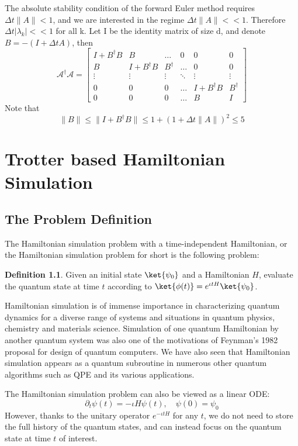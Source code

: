 \documentclass[12pt, oneside]{book}
\theoremstyle{definition}
\newtheorem{definition}{Definition}[section]
\theoremstyle{definition}
\theoremstyle{remark}
\begin{document}
The absolute stability condition of the forward Euler method requires $\Delta t\|A\|<1$, and we are interested in the regime $\Delta t\|A\|<<1$. Therefore $\Delta t|\lambda_k|<<1$ for all k. Let I be the identity matrix of size d, and denote $B=-(I+\Delta tA)$, then
\[
\mathcal{A}^{\dagger}\mathcal{A}=\begin{bmatrix} I + B^{\dagger}B & B & \ldots & 0 & 0 & 0 \\ B & I + B^{\dagger}B & B^{\dagger} & \ldots & 0 & 0 \\
\vdots & \vdots & \vdots & \ddots &\vdots & \vdots  \\
0 & 0 & 0 & \ldots & I+B^{\dagger}B & B^{\dagger} \\
0 & 0 & 0 & \ldots & B & I \end{bmatrix}
\]
Note that
\[
\|B\|\leq \|I+B^{\dagger}B\|\leq 1+(1+\Delta t\|A\|)^2\leq 5
\]
\chapter{Trotter based Hamiltonian Simulation}
\section{The Problem Definition}
The Hamiltonian simulation problem with a time-independent Hamiltonian, or the Hamiltonian simulation problem for short is the following problem: 
\begin{definition}Given an initial state $\ket{\psi_0}$ and a Hamiltonian $H$, evaluate the quantum state at time $t$ according to $\ket{\phi(t)}=e^{\iota t H}\ket{\psi_0}$. 
\end{definition}
Hamiltonian simulation is of immense importance in characterizing quantum dynamics for a diverse range of systems and situations in quantum physics, chemistry and materials science. Simulation of one quantum Hamiltonian by another quantum system was also one of the motivations of Feynman's 1982 proposal for design of quantum computers. We have also seen that Hamiltonian simulation appears as a quantum subroutine in numerous other quantum algorithms such as QPE and its various applications.

The Hamiltonian simulation problem can also be viewed as a linear ODE:
\[
\partial_t\psi(t)=-\iota H\psi(t), \quad \psi(0)=\psi_0
\]
However, thanks to the unitary operator $e^{-\iota t H}$ for any $t$, we do not need to store the full history of the quantum states, and can instead focus on the quantum state at time $t$ of interest.
\end{document}
